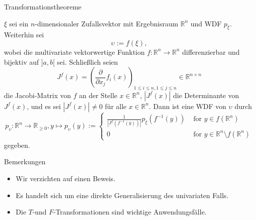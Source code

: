\documentclass[
  8pt,
  ignorenonframetext,
]{beamer}
\providecommand{\tightlist}{%
  \setlength{\itemsep}{0pt}\setlength{\parskip}{0pt}}
\newcommand{\ups}{\upsilon}
\begin{document}
\begin{frame}{Transformationstheoreme}
\protect\hypertarget{transformationstheoreme-6}{}
\footnotesize
\begin{theorem}
\normalfont
\justifying
$\xi$ sei ein $n$-dimensionaler Zufallsvektor mit Ergebnisraum $\mathbb{R}^n$ und
WDF $p_\xi$. Weiterhin sei
\begin{equation}
\ups := f(\xi),
\end{equation}
wobei die multivariate vektorwertige Funktion $f : \mathbb{R}^n \to \mathbb{R}^n$
differenzierbar und bijektiv auf $]a,b[$ sei. Schließlich seien
\begin{equation}
J^f(x)
= \left(\frac{\partial}{\partial x_j}f_i(x)\right)_{1\le i \le n, 1 \le j \le n}
\in \mathbb{R}^{n \times n}
\end{equation}
die Jacobi-Matrix von $f$ an der Stelle $x \in \mathbb{R}^n$, $|J^f(x)|$ die
Determinante von $J^f(x)$, und es sei $|J^f(x)| \neq 0$ für alle $x \in \mathbb{R}^n$.
Dann ist eine WDF von $\ups$ durch
\begin{equation}\label{eq:mpdf_transform}
p_\ups : \mathbb{R}^n \to \mathbb{R}_{\ge 0}, y \mapsto p_\ups(y) :=
\begin{cases}
\frac{1}{|J^f\left(f^{-1}(y)\right)|}p_\xi\left(f^{-1}(y)\right)
& \mbox{ for } y\in f(\mathbb{R}^n) \\
0
& \mbox{ for } y \in \mathbb{R}^n \setminus f(\mathbb{R}^n)
\end{cases}
\end{equation}
gegeben.
\end{theorem}

Bemerkungen

\begin{itemize}
\tightlist
\item
  Wir verzichten auf einen Beweis.
\item
  Es handelt sich um eine direkte Generalisierung des univariaten Falls.
\item
  Die \(T\)-und \(F\)-Transformationen sind wichtige Anwendungsfälle.
\end{itemize}
\end{frame}
\end{document}
